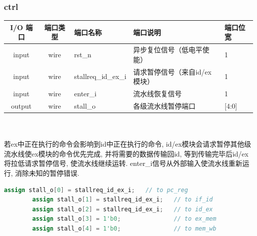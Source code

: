\documentclass[lang=cn,11pt,a4paper,chinesefont=founder]{elegantpaper}
\begin{document}
\subsubsection{ctrl}
\begin{tabular}{cclll}
    \toprule
    I/O 端口 & 端口类型 & 端口名称            & 端口说明                      & 端口位宽 \\
    \midrule
    input    & wire     & rst\_n              & 异步复位信号（低电平使能）    & 1        \\
    input    & wire     & stallreq\_id\_ex\_i & 请求暂停信号（来自id/ex模块） & 1        \\
    input    & wire     & enter\_i            & 流水线恢复信号                & 1        \\
    output   & wire     & stall\_o            & 各级流水线暂停端口            & [4:0]    \\
    \bottomrule
\end{tabular}\\
\\若ex中正在执行的命令会影响到id中正在执行的命令, id/ex模块会请求暂停其他级流水线使ex模块的命令优先完成, 并将需要的数据传输回id, 等到传输完毕后id/ex将拉低请求暂停信号, 使流水线继续运转. enter\_i信号从外部输入使流水线重新运行, 消除未知的暂停错误. 
\begin{lstlisting}[language=verilog]
		assign stall_o[0] = stallreq_id_ex_i;   // to pc_reg
		assign stall_o[1] = stallreq_id_ex_i;   // to if_id
		assign stall_o[2] = stallreq_id_ex_i;   // to id_ex
		assign stall_o[3] = 1'b0;               // to ex_mem
		assign stall_o[4] = 1'b0;               // to mem_wb
	\end{lstlisting}
\end{document}
